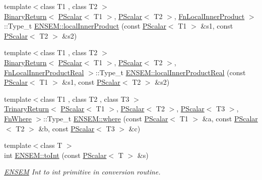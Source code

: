 \begin{DoxyCompactItemize}
\item 
{\footnotesize template$<$class T1 , class T2 $>$ }\\\mbox{\hyperlink{structENSEM_1_1BinaryReturn}{Binary\+Return}}$<$ \mbox{\hyperlink{classENSEM_1_1PScalar}{P\+Scalar}}$<$ T1 $>$, \mbox{\hyperlink{classENSEM_1_1PScalar}{P\+Scalar}}$<$ T2 $>$, \mbox{\hyperlink{structENSEM_1_1FnLocalInnerProduct}{Fn\+Local\+Inner\+Product}} $>$\+::Type\+\_\+t \mbox{\hyperlink{group__primscalar_ga1190a8f3bd7590e615a59825ca33f2b6}{E\+N\+S\+E\+M\+::local\+Inner\+Product}} (const \mbox{\hyperlink{classENSEM_1_1PScalar}{P\+Scalar}}$<$ T1 $>$ \&s1, const \mbox{\hyperlink{classENSEM_1_1PScalar}{P\+Scalar}}$<$ T2 $>$ \&s2)
\item 
{\footnotesize template$<$class T1 , class T2 $>$ }\\\mbox{\hyperlink{structENSEM_1_1BinaryReturn}{Binary\+Return}}$<$ \mbox{\hyperlink{classENSEM_1_1PScalar}{P\+Scalar}}$<$ T1 $>$, \mbox{\hyperlink{classENSEM_1_1PScalar}{P\+Scalar}}$<$ T2 $>$, \mbox{\hyperlink{structENSEM_1_1FnLocalInnerProductReal}{Fn\+Local\+Inner\+Product\+Real}} $>$\+::Type\+\_\+t \mbox{\hyperlink{group__primscalar_ga014c96c783c136201ede1f2669b6d18b}{E\+N\+S\+E\+M\+::local\+Inner\+Product\+Real}} (const \mbox{\hyperlink{classENSEM_1_1PScalar}{P\+Scalar}}$<$ T1 $>$ \&s1, const \mbox{\hyperlink{classENSEM_1_1PScalar}{P\+Scalar}}$<$ T2 $>$ \&s2)
\item 
{\footnotesize template$<$class T1 , class T2 , class T3 $>$ }\\\mbox{\hyperlink{structENSEM_1_1TrinaryReturn}{Trinary\+Return}}$<$ \mbox{\hyperlink{classENSEM_1_1PScalar}{P\+Scalar}}$<$ T1 $>$, \mbox{\hyperlink{classENSEM_1_1PScalar}{P\+Scalar}}$<$ T2 $>$, \mbox{\hyperlink{classENSEM_1_1PScalar}{P\+Scalar}}$<$ T3 $>$, \mbox{\hyperlink{structENSEM_1_1FnWhere}{Fn\+Where}} $>$\+::Type\+\_\+t \mbox{\hyperlink{group__primscalar_ga2696f074fb7cc4b547788bbf78867d23}{E\+N\+S\+E\+M\+::where}} (const \mbox{\hyperlink{classENSEM_1_1PScalar}{P\+Scalar}}$<$ T1 $>$ \&a, const \mbox{\hyperlink{classENSEM_1_1PScalar}{P\+Scalar}}$<$ T2 $>$ \&b, const \mbox{\hyperlink{classENSEM_1_1PScalar}{P\+Scalar}}$<$ T3 $>$ \&c)
\item 
{\footnotesize template$<$class T $>$ }\\int \mbox{\hyperlink{group__primscalar_ga5ec99dbe9e18daf372190e5c3b1a00fa}{E\+N\+S\+E\+M\+::to\+Int}} (const \mbox{\hyperlink{classENSEM_1_1PScalar}{P\+Scalar}}$<$ T $>$ \&s)
\begin{DoxyCompactList}\small\item\em \mbox{\hyperlink{namespaceENSEM}{E\+N\+S\+EM}} Int to int primitive in conversion routine. \end{DoxyCompactList}\item 

\end{DoxyCompactItemize}
